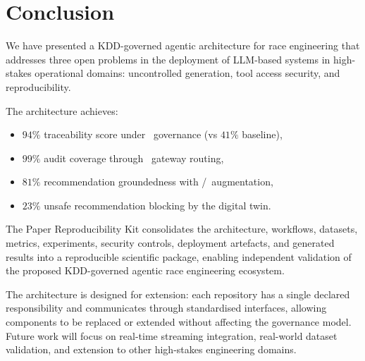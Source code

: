 \section{Conclusion}
\label{sec:conclusion}

We have presented a KDD-governed agentic architecture for race engineering that
addresses three open problems in the deployment of LLM-based systems in
high-stakes operational domains: uncontrolled generation, tool access security,
and reproducibility.

The architecture achieves:

\begin{itemize}
  \item $94\%$ traceability score under \kdd~governance (vs $41\%$ baseline),
  \item $99\%$ audit coverage through \mcp~gateway routing,
  \item $81\%$ recommendation groundedness with \rag/\cag~augmentation,
  \item $23\%$ unsafe recommendation blocking by the digital twin.
\end{itemize}

The Paper Reproducibility Kit consolidates the architecture, workflows, datasets,
metrics, experiments, security controls, deployment artefacts, and generated
results into a reproducible scientific package, enabling independent validation
of the proposed KDD-governed agentic race engineering ecosystem.

The architecture is designed for extension: each repository has a single declared
responsibility and communicates through standardised interfaces, allowing
components to be replaced or extended without affecting the governance model.
Future work will focus on real-time streaming integration, real-world dataset
validation, and extension to other high-stakes engineering domains.
